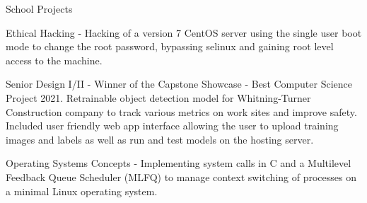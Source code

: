 \documentclass{resume} %
\begin{document}
\begin{rSection}{School Projects}
	\item Ethical Hacking - Hacking of a version 7 CentOS server using the single user boot mode to change the root password, bypassing selinux and gaining root level access to the machine.
	\item Senior Design I/II - Winner of the Capstone Showcase - Best Computer Science Project 2021. Retrainable object detection model for Whitning-Turner Construction company to track various metrics on work sites and improve safety. Included user friendly web app interface allowing the user to upload training images and labels as well as run and test models on the hosting server.
	\item Operating Systems Concepts - Implementing system calls in C and a Multilevel Feedback Queue Scheduler (MLFQ) to manage context switching of processes on a minimal Linux operating system.
\end{rSection}


\end{document}
